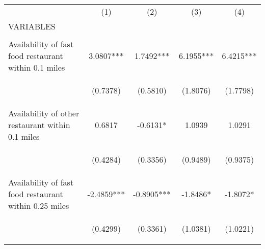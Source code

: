 \documentclass[]{article}
\begin{document}
\begin{center}
\begin{tabular}{lcccc} \hline
 & (1) & (2) & (3) & (4) \\
VARIABLES &  &  &  &  \\ \hline
\vspace{4pt} & \begin{footnotesize}\end{footnotesize} & \begin{footnotesize}\end{footnotesize} & \begin{footnotesize}\end{footnotesize} & \begin{footnotesize}\end{footnotesize} \\
Availability of fast food restaurant within 0.1 miles & 3.0807*** & 1.7492*** & 6.1955*** & 6.4215*** \\
\vspace{4pt} & \begin{footnotesize}(0.7378)\end{footnotesize} & \begin{footnotesize}(0.5810)\end{footnotesize} & \begin{footnotesize}(1.8076)\end{footnotesize} & \begin{footnotesize}(1.7798)\end{footnotesize} \\
Availability of other restaurant within 0.1 miles & 0.6817 & -0.6131* & 1.0939 & 1.0291 \\
\vspace{4pt} & \begin{footnotesize}(0.4284)\end{footnotesize} & \begin{footnotesize}(0.3356)\end{footnotesize} & \begin{footnotesize}(0.9489)\end{footnotesize} & \begin{footnotesize}(0.9375)\end{footnotesize} \\
Availability of fast food restaurant within 0.25 miles & -2.4859*** & -0.8905*** & -1.8486* & -1.8072* \\
\vspace{4pt} & \begin{footnotesize}(0.4299)\end{footnotesize} & \begin{footnotesize}(0.3361)\end{footnotesize} & \begin{footnotesize}(1.0381)\end{footnotesize} & \begin{footnotesize}(1.0221)\end{footnotesize} \\

\end{tabular}
\end{center}
\end{document}
